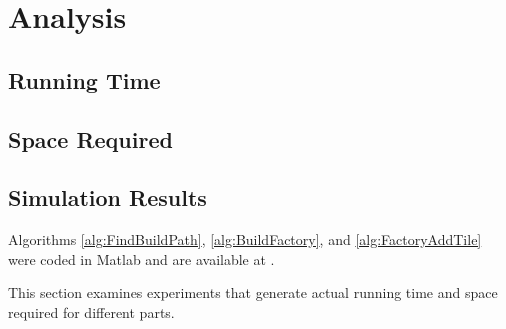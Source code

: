 



\section{Analysis}\label{sec:Analysis}

\subsection{Running Time}\label{sec:runningTime}


\subsection{Space Required}\label{sec:requiredSpace}

\subsection{Simulation Results}\label{sec:simResults}

Algorithms  \ref{alg:FindBuildPath}, \ref{alg:BuildFactory}, and \ref{alg:FactoryAddTile}  were coded in {\sc Matlab} and are available at \cite{Manzoor2017gitAssemply}.  

This section examines experiments that generate actual running time and space required for different parts.



